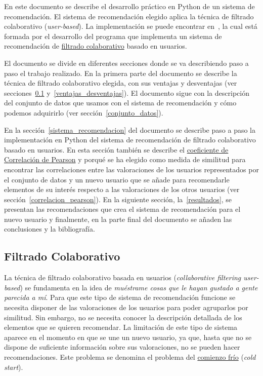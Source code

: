 \documentclass{uimppracticas}
\begin{document}
En este documento se describe el desarrollo práctico en Python de un sistema de recomendación. El sistema de recomendación elegido aplica la técnica de filtrado colaborativo (\textit{user-based}). La implementación se puede encontrar en~\cite{GitHubRepo}, la cual está formada por el desarrollo del programa que implementa un sistema de recomendación de \href{https://es.wikipedia.org/wiki/Filtrado_colaborativo}{filtrado colaborativo} basado en usuarios. 

El documento se divide en diferentes secciones donde se va describiendo paso a paso el trabajo realizado. En la primera parte del documento se describe la técnica de filtrado colaborativo elegida, con sus ventajas y desventajas (ver secciones~\ref{filtro_colaborativo} y~\ref{ventajas_desventajas}). El documento sigue con la descripción del conjunto de datos que usamos con el sistema de recomendación y cómo podemos adquirirlo (ver sección~\ref{conjunto_datos}).

En la sección~\ref{sistema_recomendacion} del documento se describe paso a paso la implementación en Python del sistema de recomendación de filtrado colaborativo basado en usuarios. En esta sección también se describe el \href{https://es.wikipedia.org/wiki/Coeficiente_de_correlaci\%C3\%B3n_de_Pearson}{coeficiente de Correlación de Pearson} y porqué se ha elegido como medida de similitud para encontrar las correlaciones entre las valoraciones de los usuarios representados por el conjunto de datos y un nuevo usuario que se añade para recomendarle elementos de su interés respecto a las valoraciones de los otros usuarios (ver sección~\ref{correlacion_pearson}). En la siguiente sección, la~\ref{resultados}, se presentan las recomendaciones que crea el sistema de recomendación para el nuevo usuario y finalmente, en la parte final del documento se añaden las conclusiones y la bibliografía.

\subsection{Filtrado Colaborativo}\label{filtro_colaborativo}

La técnica de filtrado colaborativo basada en usuarios (\textit{collaborative filtering user-based}) se fundamenta en la idea de \textit{muéstrame cosas que le hayan gustado a gente parecida a mí}. Para que este tipo de sistema de recomendación funcione se necesita disponer de las valoraciones de los usuarios para poder agruparlos por similitud. Sin embargo, no se necesita conocer la descripción detallada de los elementos que se quieren recomendar. La limitación de este tipo de sistema aparece en el momento en que se une un nuevo usuario, ya que, hasta que no se dispone de suficiente información sobre sus valoraciones, no se pueden hacer recomendaciones. Este problema se denomina el problema del \href{https://es.wikipedia.org/wiki/Arranque_en_fr\%C3\%ADo}{comienzo frío} (\textit{cold start}).
\end{document}
